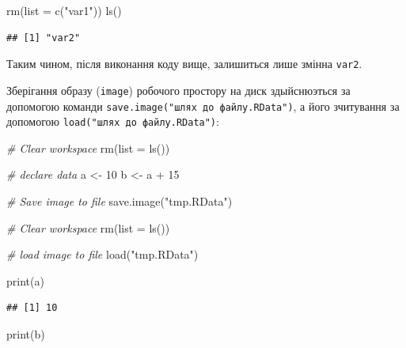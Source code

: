 \documentclass[
]{book}
\newenvironment{Shaded}{\begin{snugshade}}{\end{snugshade}}
\newcommand{\AttributeTok}[1]{\textcolor[rgb]{0.77,0.63,0.00}{#1}}
\newcommand{\CommentTok}[1]{\textcolor[rgb]{0.56,0.35,0.01}{\textit{#1}}}
\newcommand{\DecValTok}[1]{\textcolor[rgb]{0.00,0.00,0.81}{#1}}
\newcommand{\FunctionTok}[1]{\textcolor[rgb]{0.00,0.00,0.00}{#1}}
\newcommand{\NormalTok}[1]{#1}
\newcommand{\OtherTok}[1]{\textcolor[rgb]{0.56,0.35,0.01}{#1}}
\newcommand{\SpecialCharTok}[1]{\textcolor[rgb]{0.00,0.00,0.00}{#1}}
\newcommand{\StringTok}[1]{\textcolor[rgb]{0.31,0.60,0.02}{#1}}
\begin{document}
\begin{Shaded}
\begin{Highlighting}[]
\FunctionTok{rm}\NormalTok{(}\AttributeTok{list =} \FunctionTok{c}\NormalTok{(}\StringTok{"var1"}\NormalTok{))}
\FunctionTok{ls}\NormalTok{()}
\end{Highlighting}
\end{Shaded}

\begin{verbatim}
## [1] "var2"
\end{verbatim}

Таким чином, після виконання коду вище, залишиться лише змінна \texttt{var2}.

Зберігання образу (\texttt{image}) робочого простору на диск здыйснюэться за допомогою команди \texttt{save.image("шлях\ до\ файлу.RData")}, а його зчитування за допомогою \texttt{load("шлях\ до\ файлу.RData")}:

\begin{Shaded}
\begin{Highlighting}[]
\CommentTok{\# Clear workspace}
\FunctionTok{rm}\NormalTok{(}\AttributeTok{list =} \FunctionTok{ls}\NormalTok{())}

\CommentTok{\# declare data}
\NormalTok{a }\OtherTok{\textless{}{-}} \DecValTok{10}
\NormalTok{b }\OtherTok{\textless{}{-}}\NormalTok{ a }\SpecialCharTok{+} \DecValTok{15}

\CommentTok{\# Save image to file}
\FunctionTok{save.image}\NormalTok{(}\StringTok{"tmp.RData"}\NormalTok{)}
\end{Highlighting}
\end{Shaded}

\begin{Shaded}
\begin{Highlighting}[]
\CommentTok{\# Clear workspace}
\FunctionTok{rm}\NormalTok{(}\AttributeTok{list =} \FunctionTok{ls}\NormalTok{())}

\CommentTok{\# load image to file}
\FunctionTok{load}\NormalTok{(}\StringTok{"tmp.RData"}\NormalTok{)}

\FunctionTok{print}\NormalTok{(a)}
\end{Highlighting}
\end{Shaded}

\begin{verbatim}
## [1] 10
\end{verbatim}

\begin{Shaded}
\begin{Highlighting}[]
\FunctionTok{print}\NormalTok{(b)}
\end{Highlighting}
\end{Shaded}
\end{document}
